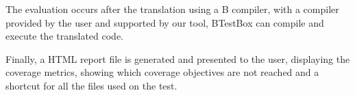 \documentclass[runningheads]{llncs}
\begin{document}
The evaluation occurs after the translation using a B compiler, with a compiler provided by the user and supported by our tool, BTestBox can compile and execute the translated code. 

Finally, a HTML report file is generated and presented to the user, displaying the coverage metrics, showing which coverage objectives are not reached and a shortcut for all the files used on the test.

\end{document}

